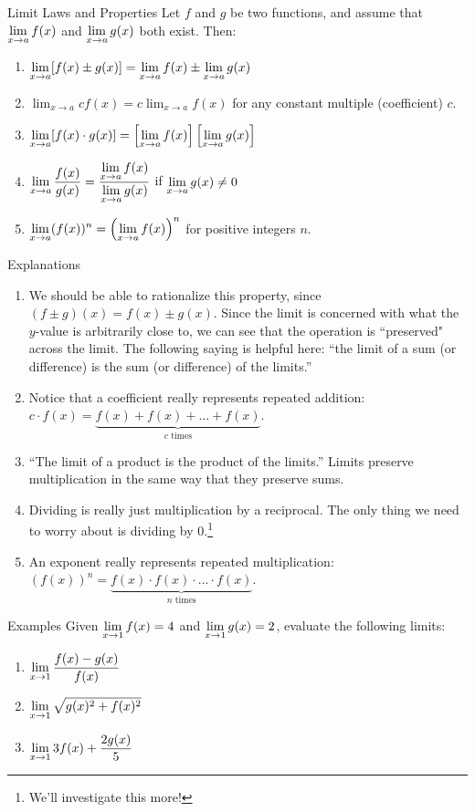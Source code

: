 \begin{imp}{Limit Laws and Properties}
  Let $f$ and $g$ be two functions, and assume that $\displaystyle \lim_{x\to a} f(x)$ and $\displaystyle \lim_{x\to a} g(x)$ both exist.
  Then:
  \begin{enumerate}
    \item $\displaystyle \lim_{x\to a} [f(x)\pm g(x)] = \lim_{x\to a} f(x) \pm \lim_{x\to a} g(x)$
    \item $\displaystyle\lim_{x\to a} cf(x) = c\lim_{x\to a} f(x)$ for any constant multiple (coefficient) $c$.
    \item $\displaystyle \lim_{x\to a} [f(x)\cdot g(x)] = \left[\lim_{x\to a} f(x)\right] \left[\lim_{x\to a} g(x)\right]$
    \item $\displaystyle \lim_{x\to a} \frac{f(x)}{g(x)} = \frac{\displaystyle \lim_{x\to a} f(x)}{\displaystyle \lim_{x\to a} g(x)}$ if $\displaystyle \lim_{x\to a} g(x)\neq0$
    \item $\displaystyle \lim_{x\to a} (f(x))^n = \left(\displaystyle \lim_{x\to a} f(x) \right)^n$ for positive integers $n$.
  \end{enumerate}
\end{imp}

\begin{note}{Explanations}\hspace{1cm}
  \begin{enumerate}
    \item We should be able to rationalize this property, since $(f\pm g)(x)= f(x)\pm g(x)$.
    Since the limit is concerned with what the $y$-value is arbitrarily close to, we can see that the operation is ``preserved" across the limit.
    The following saying is helpful here: ``the limit of a sum (or difference) is the sum (or difference) of the limits.''
    \item Notice that a coefficient really represents repeated addition: $c\cdot f(x) = \underbrace{f(x) + f(x) + ...+ f(x)}_{c \text{ times}}$.
    \item ``The limit of a product is the product of the limits.''
    Limits preserve multiplication in the same way that they preserve sums.
    \item Dividing is really just multiplication by a reciprocal.
    The only thing we need to worry about is dividing by 0.\footnote{We'll investigate this more!}
    \item An exponent really represents repeated multiplication: $(f(x))^n = \underbrace{f(x) \cdot f(x) \cdot ... \cdot f(x)}_{n \text{ times}}$.
  \end{enumerate}
\end{note}

\begin{note}{Examples}
  Given $\displaystyle \lim_{x\to 1} f(x) = 4$ and $\displaystyle \lim_{x\to 1} g(x) = 2$, evaluate the following limits:
  \begin{enumerate}
    \item $\displaystyle \lim_{x\to 1}\dfrac{f(x)-g(x)}{f(x)}$
    \item $\displaystyle \lim_{x\to 1} \sqrt{g(x)^2+f(x)^2}$
    \item $\displaystyle \lim_{x\to 1} 3f(x)+\dfrac{2g(x)}{5}$
  \end{enumerate}
\end{note}
